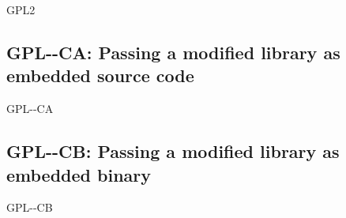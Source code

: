 \begin{license}{GPL2}
\subsection{GPL-\ver-CA: Passing a modified library as embedded source code}
\begin{lsuc}{GPL-\ver-CA}

  \useCaseA{\ver}
  \coversA

  \begin{lsucrequires}
    \lsucmandatory{\keepLicenseElements}
    \lsucmandatory{\gpltwoEnsureCopyrightNoticeSource}
    \lsucmandatory{\giveLicense}\passingFilesCorrectly
    \lsucmandatory{\retainCopyrightNotices}
    \lsucmandatory{\addToCopyrightDialogLib}
    \lsucmandatory{\markEmbeddedModifications}
    \lsucmandatory{\arrangeEmbeddedChanges}\howToApplyTheseTerms
    \lsucmandatory{\arrangeEnclosingSources}
    \lsucoptional{\createChangelog}
    \lsucoptional{\addToDocumentation}
  \end{lsucrequires}

  \lsucprohibitsnothing
\end{lsuc}

\subsection{GPL-\ver-CB: Passing a modified library as embedded binary}
\begin{lsuc}{GPL-\ver-CB}

  \useCaseB{\ver}
  \coversB

  \begin{lsucrequires}
    \lsucmandatory{\keepLicenseElements}
    \lsucmandatory{\gpltwoEnsureCopyrightNoticeBinary}
    \lsucmandatory{\giveLicense}\passingFilesCorrectly
    \lsucmandatory{\retainCopyrightNotices}
    \lsucmandatory{\makeAllSourcesAvailable}
    \lsucmandatory{\describeHowToGetSource}
    \lsucmandatory{\addToCopyrightDialogLib}
    \lsucmandatory{\markEmbeddedModifications}
    \lsucmandatory{\arrangeEmbeddedChanges}\howToApplyTheseTerms
    \lsucmandatory{\arrangeEnclosingBinaries}
    \lsucoptional{\createChangelog}
    \lsucoptional{\addToDocumentation}
  \end{lsucrequires}

  \lsucprohibitsnothing
\end{lsuc}

\end{license}

